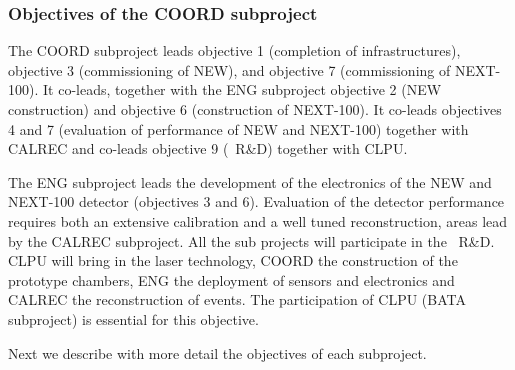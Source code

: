 \subsubsection*{Objectives of the COORD subproject}
The COORD subproject leads objective 1 (completion of infrastructures),
objective 3 (commissioning of NEW), and objective 7 (commissioning of NEXT-100). It co-leads, together with the ENG subproject objective 2 (NEW construction) and objective 6 (construction of NEXT-100). It co-leads objectives 4 and 7 (evaluation of performance of NEW and NEXT-100) together with CALREC and co-leads objective 9 (\BATA\ R\&D) together with CLPU.

The ENG subproject leads the development of the electronics of the NEW and NEXT-100 detector (objectives 3 and 6). Evaluation of the detector performance requires both an extensive calibration and a well tuned reconstruction, areas lead by the CALREC subproject. All the sub projects will participate in the \BATA\ R\&D. CLPU will bring in the laser technology, COORD the construction of the prototype chambers, ENG the deployment of sensors and electronics and CALREC the reconstruction of events. The participation of CLPU (BATA subproject) is essential for this objective.

Next we describe with more detail the objectives of each subproject.


